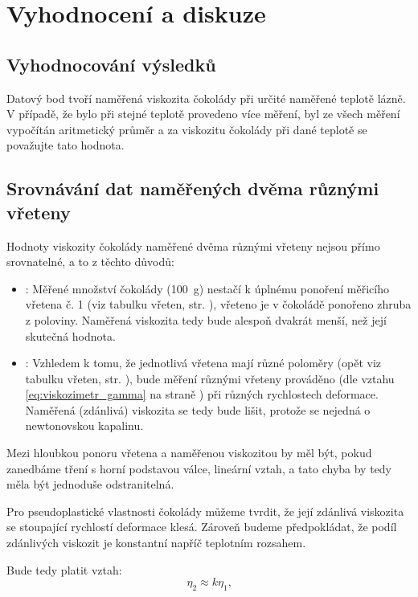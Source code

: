 \documentclass[12pt]{article}
\begin{document}
\newpage
\section{Vyhodnocení a diskuze}
\subsection{Vyhodnocování výsledků}
Datový bod tvoří naměřená viskozita čokolády při určité naměřené teplotě lázně. V případě, že bylo při stejné teplotě provedeno více měření, byl ze všech měření vypočítán aritmetický průměr a za viskozitu čokolády při dané teplotě se považujte tato hodnota.

\subsection{Srovnávání dat naměřených dvěma různými vřeteny}
Hodnoty viskozity čokolády naměřené dvěma různými vřeteny nejsou přímo srovnatelné, a to z těchto důvodů:
\begin{itemize}[noitemsep, topsep = 0pt]
    \item \underline{}: Měřené množství čokolády (\SI{100}{\gram}) nestačí k úplnému ponoření měřicího vřetena č. 1 (viz tabulku vřeten, str. \pageref{tab:vretena}), vřeteno je v čokoládě ponořeno zhruba z poloviny. Naměřená viskozita tedy bude alespoň dvakrát menší, než její skutečná hodnota. 
    \item \underline{}: Vzhledem k tomu, že jednotlivá vřetena mají různé poloměry (opět viz tabulku vřeten, str. \pageref{tab:vretena}), bude měření různými vřeteny prováděno (dle vztahu \ref{eq:viskozimetr_gamma} na straně \pageref{eq:viskozimetr_gamma}) při různých rychlostech deformace. Naměřená (zdánlivá) viskozita se tedy bude lišit, protože se nejedná o newtonovskou kapalinu.
\end{itemize}
Mezi hloubkou ponoru vřetena a naměřenou viskozitou by měl být, pokud zanedbáme tření s horní podstavou válce, lineární vztah, a tato chyba by tedy měla být jednoduše odstranitelná.
\par\noindent
Pro pseudoplastické vlastnosti čokolády můžeme tvrdit, že její zdánlivá viskozita se stoupající rychlostí deformace klesá. Zároveň budeme předpokládat, že podíl zdánlivých viskozit je konstantní napříč teplotním rozsahem.
\par\noindent
Bude tedy platit vztah:
\begin{equation}
    \eta_2 \approx k\eta_1\text{,}
    \label{eq:prepocet}
\end{equation}
\end{document}
